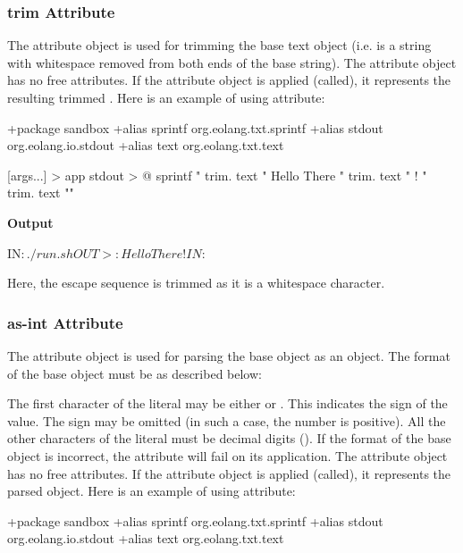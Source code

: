 \documentclass[12pt]{book}
\begin{document}
{\subsubsection{trim Attribute} 
The  attribute object is used for trimming the base text object (i.e.  is a string with whitespace removed from both ends of the base string).
The  attribute object has no free attributes.
If the  attribute object is applied (called), it represents the resulting trimmed . Here is an example of using  attribute:

\begin{ffcode}
+package sandbox
+alias sprintf org.eolang.txt.sprintf
+alias stdout org.eolang.io.stdout
+alias text org.eolang.txt.text

[args...] > app
  stdout > @
    sprintf
      "%
      trim.
        text "  Hello There  "
      trim.
        text "            !           "
      trim.
        text "\n"
\end{ffcode}
\textbf{Output}
\begin{ffcode}
IN$: ./run.sh
OUT>: Hello There!IN$: 
\end{ffcode}

Here, the \ff{\n} escape sequence is trimmed as it is a
whitespace character.

\subsubsection{as-int Attribute}
The  attribute object is used for parsing the base  object as an  object.
The format of the base  object must be as described below:

The first character of the  literal may be either \ff{+} or \ff{-}. This indicates the sign of the  value. The sign may be omitted (in such a case, the number is positive).
All the other characters of the  literal must be decimal digits ().
If the format of the base  object is incorrect, the  attribute will fail on its application.
The  attribute object has no free attributes.
If the  attribute object is applied (called), it represents the parsed  object. Here is an example of using  attribute:

\begin{ffcode}
+package sandbox
+alias sprintf org.eolang.txt.sprintf
+alias stdout org.eolang.io.stdout
+alias text org.eolang.txt.text


\end{ffcode}}
\end{document}
